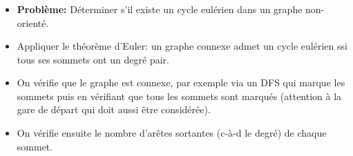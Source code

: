 \begin{frame}
    \frametitle{\problemtitle}
    \begin{itemize}
        \item<+-> \textbf{Problème:} Déterminer s'il existe un cycle eulérien dans un graphe non-orienté.
        \item<+-> Appliquer le théorème d'Euler: un graphe connexe admet un cycle eulérien ssi tous ses sommets ont un degré pair.
        \item<+-> On vérifie que le graphe est connexe, par exemple via un DFS qui marque les sommets puis en vérifiant que tous les sommets sont marqués (attention à la gare de départ qui doit aussi être considérée).
        \item<+-> On vérifie ensuite le nombre d'arêtes sortantes (c-à-d le degré) de chaque sommet.
    \end{itemize}
\end{frame}
